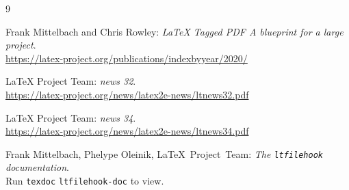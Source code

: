 \documentclass{ltnews}
\providecommand\Dash {\unskip \textemdash}
\begin{document}
\medskip

\begin{thebibliography}{9}

\fontsize{9.3}{11.3}\selectfont

 Frank Mittelbach and Chris Rowley:
  \emph{\LaTeX{} Tagged PDF \Dash A blueprint for a large project}.\\
  \url{https://latex-project.org/publications/indexbyyear/2020/}

 \LaTeX{} Project Team:
  \emph{\LaTeXe{} news 32}.\\
  \url{https://latex-project.org/news/latex2e-news/ltnews32.pdf}

 \LaTeX{} Project Team:
  \emph{\LaTeXe{} news 34}.\\
  \url{https://latex-project.org/news/latex2e-news/ltnews34.pdf}

 Frank Mittelbach, Phelype Oleinik, \LaTeX{}~Project~Team:
  \emph{The \texttt{\upshape ltfilehook} documentation}.\\
  Run \texttt{texdoc} \texttt{ltfilehook-doc} to view.
\end{thebibliography}
\end{document}
